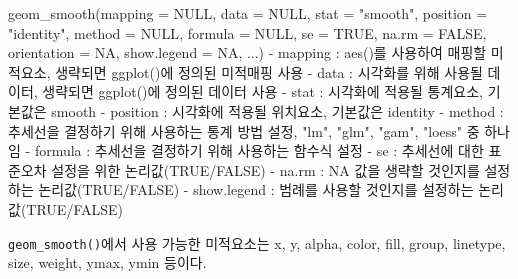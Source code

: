 \documentclass[
]{article}
\newenvironment{Shaded}{\begin{snugshade}}{\end{snugshade}}
\newcommand{\AttributeTok}[1]{\textcolor[rgb]{0.77,0.63,0.00}{#1}}
\newcommand{\ConstantTok}[1]{\textcolor[rgb]{0.00,0.00,0.00}{#1}}
\newcommand{\FunctionTok}[1]{\textcolor[rgb]{0.00,0.00,0.00}{#1}}
\newcommand{\NormalTok}[1]{#1}
\newcommand{\SpecialCharTok}[1]{\textcolor[rgb]{0.00,0.00,0.00}{#1}}
\newcommand{\StringTok}[1]{\textcolor[rgb]{0.31,0.60,0.02}{#1}}
\begin{document}
\begin{Shaded}
\begin{Highlighting}[]
\FunctionTok{geom\_smooth}\NormalTok{(}\AttributeTok{mapping =} \ConstantTok{NULL}\NormalTok{, }\AttributeTok{data =} \ConstantTok{NULL}\NormalTok{, }\AttributeTok{stat =} \StringTok{"smooth"}\NormalTok{, }\AttributeTok{position =} \StringTok{"identity"}\NormalTok{, }\AttributeTok{method =} \ConstantTok{NULL}\NormalTok{,   }\AttributeTok{formula =} \ConstantTok{NULL}\NormalTok{, }\AttributeTok{se =} \ConstantTok{TRUE}\NormalTok{, }\AttributeTok{na.rm =} \ConstantTok{FALSE}\NormalTok{, }\AttributeTok{orientation =} \ConstantTok{NA}\NormalTok{, }\AttributeTok{show.legend =} \ConstantTok{NA}\NormalTok{, ...)}
  \SpecialCharTok{{-}}\NormalTok{ mapping }\SpecialCharTok{:} \FunctionTok{aes}\NormalTok{()를 사용하여 매핑할 미적요소, 생략되면 }\FunctionTok{ggplot}\NormalTok{()에 정의된 미적매핑 사용}
  \SpecialCharTok{{-}}\NormalTok{ data }\SpecialCharTok{:}\NormalTok{ 시각화를 위해 사용될 데이터, 생략되면 }\FunctionTok{ggplot}\NormalTok{()에 정의된 데이터 사용}
  \SpecialCharTok{{-}}\NormalTok{ stat }\SpecialCharTok{:}\NormalTok{ 시각화에 적용될 통계요소, 기본값은 }\StringTok{\textquotesingle{}smooth\textquotesingle{}}
  \SpecialCharTok{{-}}\NormalTok{ position }\SpecialCharTok{:}\NormalTok{ 시각화에 적용될 위치요소, 기본값은 }\StringTok{\textquotesingle{}identity\textquotesingle{}}
  \SpecialCharTok{{-}}\NormalTok{ method }\SpecialCharTok{:}\NormalTok{ 추세선을 결정하기 위해 사용하는 통계 방법 설정, }\StringTok{"lm"}\NormalTok{, }\StringTok{"glm"}\NormalTok{, }\StringTok{"gam"}\NormalTok{, }\StringTok{"loess"}\NormalTok{ 중 하나임}
  \SpecialCharTok{{-}}\NormalTok{ formula }\SpecialCharTok{:}\NormalTok{  추세선을 결정하기 위해 사용하는 함수식 설정}
  \SpecialCharTok{{-}}\NormalTok{ se }\SpecialCharTok{:}\NormalTok{ 추세선에 대한 표준오차 설정을 위한 논리값(}\ConstantTok{TRUE}\SpecialCharTok{/}\ConstantTok{FALSE}\NormalTok{)}
  \SpecialCharTok{{-}}\NormalTok{ na.rm }\SpecialCharTok{:} \ConstantTok{NA}\NormalTok{ 값을 생략할 것인지를 설정하는 논리값(}\ConstantTok{TRUE}\SpecialCharTok{/}\ConstantTok{FALSE}\NormalTok{)}
  \SpecialCharTok{{-}}\NormalTok{ show.legend }\SpecialCharTok{:}\NormalTok{ 범례를 사용할 것인지를 설정하는 논리값(}\ConstantTok{TRUE}\SpecialCharTok{/}\ConstantTok{FALSE}\NormalTok{) }
\end{Highlighting}
\end{Shaded}

\texttt{geom\_smooth()}에서 사용 가능한 미적요소는 x, y, alpha, color, fill, group, linetype, size, weight, ymax, ymin 등이다.
\end{document}
